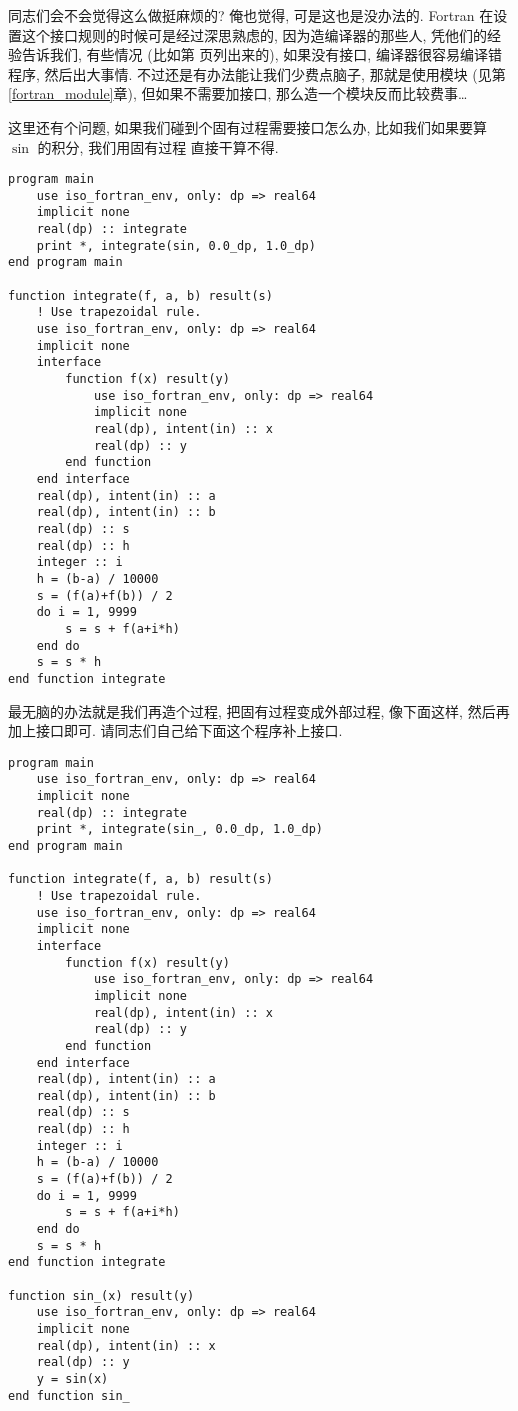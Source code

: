 同志们会不会觉得这么做挺麻烦的? 俺也觉得, 可是这也是没办法的. Fortran 在设置这个接口规则的时候可是经过深思熟虑的, 因为造编译器的那些人, 凭他们的经验告诉我们, 有些情况 (比如第 \pageref{whether_specific_interface} 页列出来的), 如果没有接口, 编译器很容易编译错程序, 然后出大事情. 不过还是有办法能让我们少费点脑子, 那就是使用模块 (见第\ref{fortran_module}章), 但如果不需要加接口, 那么造一个模块反而比较费事\dots{}

这里还有个问题, 如果我们碰到个固有过程需要接口怎么办, 比如我们如果要算 $ \sin $ 的积分, 我们用固有过程  直接干算不得.
\begin{lstlisting} 
program main
    use iso_fortran_env, only: dp => real64
    implicit none
    real(dp) :: integrate
    print *, integrate(sin, 0.0_dp, 1.0_dp)
end program main

function integrate(f, a, b) result(s)
    ! Use trapezoidal rule.
    use iso_fortran_env, only: dp => real64
    implicit none
    interface
        function f(x) result(y)
            use iso_fortran_env, only: dp => real64
            implicit none
            real(dp), intent(in) :: x
            real(dp) :: y
        end function
    end interface
    real(dp), intent(in) :: a
    real(dp), intent(in) :: b
    real(dp) :: s
    real(dp) :: h
    integer :: i
    h = (b-a) / 10000
    s = (f(a)+f(b)) / 2
    do i = 1, 9999
        s = s + f(a+i*h)
    end do
    s = s * h
end function integrate
\end{lstlisting} 
最无脑的办法就是我们再造个过程, 把固有过程变成外部过程, 像下面这样, 然后再加上接口即可. 请同志们自己给下面这个程序补上接口. 
\begin{lstlisting} 
program main
    use iso_fortran_env, only: dp => real64
    implicit none
    real(dp) :: integrate
    print *, integrate(sin_, 0.0_dp, 1.0_dp)
end program main

function integrate(f, a, b) result(s)
    ! Use trapezoidal rule.
    use iso_fortran_env, only: dp => real64
    implicit none
    interface
        function f(x) result(y)
            use iso_fortran_env, only: dp => real64
            implicit none
            real(dp), intent(in) :: x
            real(dp) :: y
        end function
    end interface
    real(dp), intent(in) :: a
    real(dp), intent(in) :: b
    real(dp) :: s
    real(dp) :: h
    integer :: i
    h = (b-a) / 10000
    s = (f(a)+f(b)) / 2
    do i = 1, 9999
        s = s + f(a+i*h)
    end do
    s = s * h
end function integrate

function sin_(x) result(y)
    use iso_fortran_env, only: dp => real64
    implicit none
    real(dp), intent(in) :: x
    real(dp) :: y
    y = sin(x)
end function sin_
\end{lstlisting} 

